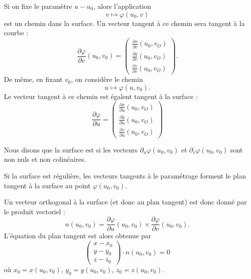 Si on fixe le paramètre \( u-u_0\), alors l'application
\begin{equation}
	v\mapsto\varphi(u_0,v)
\end{equation}
est un chemin dans la surface. Un vecteur tangent à ce chemin sera tangent à la courbe :
\begin{equation}
	\frac{ \partial \varphi }{ \partial v }(u_0,v_0)=
	\begin{pmatrix}
		\frac{ \partial x }{ \partial v }(u_0,v_O) \\
		\frac{ \partial y }{ \partial v }(u_0,v_O) \\
		\frac{ \partial z }{ \partial v }(u_0,v_O)
	\end{pmatrix}.
\end{equation}
De même, en fixant \( v_0\), on considère le chemin
\begin{equation}
	u\mapsto\varphi(u,v_0).
\end{equation}
Le vecteur tangent à ce chemin est égalent tangent à la surface :
\begin{equation}
	\frac{ \partial \varphi }{ \partial u }=
	\begin{pmatrix}
		\frac{ \partial x }{ \partial u }(u_0,v_O) \\
		\frac{ \partial y }{ \partial u }(u_0,v_O) \\
		\frac{ \partial z }{ \partial u }(u_0,v_O)
	\end{pmatrix}
\end{equation}

\begin{definition}      \label{DefSurfReguliere}
	Nous disons que la surface est  si les vecteurs \( \partial_u\varphi(u_0,v_0)\) et \( \partial_v\varphi(u_0,v_0)\) sont non nuls et non colinéaires.
\end{definition}
Si la surface est régulière, les vecteurs tangents à le paramétrage forment le plan tangent à la surface au point \( \varphi(u_0,v_0)\).

Un vecteur orthogonal à la surface (et donc au plan tangent) est donc donné par le produit vectoriel :
\begin{equation}
	n(u_0,v_0)=\frac{ \partial \varphi }{ \partial u }(u_0,v_0)  \times \frac{ \partial \varphi }{ \partial v }(u_0,v_0).
\end{equation}
L'équation du plan tangent est alors obtenue par
\begin{equation}        \label{EqPlanTgSurfaceParm}
	\begin{pmatrix}
		x-x_0 \\
		y-y_0 \\
		z-z_0
	\end{pmatrix}\cdot n(u_0,v_0)=0
\end{equation}
où \( x_0=x(u_0,v_0)\), \( y_0=y(u_0,v_0)\), \( z_0=z(u_0,v_0)\).

